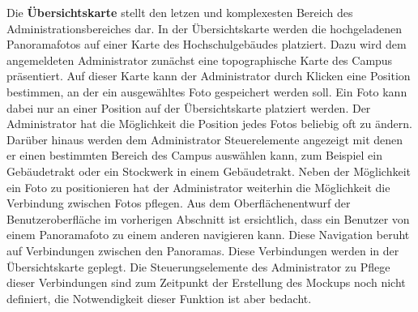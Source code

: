Die \textbf{Übersichtskarte} stellt den letzen und komplexesten Bereich des Administrationsbereiches dar. In der Übersichtskarte werden die hochgeladenen Panoramafotos auf einer Karte des Hochschulgebäudes platziert. Dazu wird dem angemeldeten Administrator zunächst eine topographische Karte des Campus präsentiert. Auf dieser Karte kann der Administrator durch Klicken eine Position bestimmen, an der ein ausgewähltes Foto gespeichert werden soll.
Ein Foto kann dabei nur an einer Position auf der Übersichtskarte platziert werden. Der Administrator hat die Möglichkeit die Position jedes Fotos beliebig oft zu ändern. Darüber hinaus werden dem Administrator Steuerelemente angezeigt mit denen er einen bestimmten Bereich des Campus auswählen kann, zum Beispiel ein Gebäudetrakt oder ein Stockwerk in einem Gebäudetrakt. Neben der Möglichkeit ein Foto zu positionieren hat der Administrator weiterhin die Möglichkeit
die Verbindung zwischen Fotos pflegen. Aus dem Oberflächenentwurf der Benutzeroberfläche im vorherigen Abschnitt ist ersichtlich, dass ein Benutzer von einem Panoramafoto zu einem anderen navigieren kann. Diese Navigation beruht auf Verbindungen zwischen den Panoramas. Diese Verbindungen werden in der Übersichtskarte geplegt. Die Steuerungselemente des Administrator zu Pflege dieser Verbindungen sind zum Zeitpunkt der Erstellung des Mockups noch nicht definiert, die Notwendigkeit dieser Funktion ist aber bedacht.
